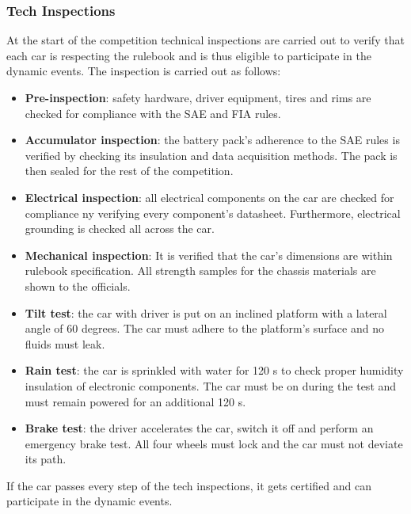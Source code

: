 \subsubsection{Tech Inspections}
At the start of the competition technical inspections are carried out to verify that each car is respecting the rulebook and is thus eligible to participate in the dynamic events.
The inspection is carried out as follows:
\begin{itemize}
    \item \textbf{Pre-inspection}: safety hardware, driver equipment, tires and rims are checked for compliance with the SAE and FIA rules.
    \item \textbf{Accumulator inspection}: the battery pack's adherence to the SAE rules is verified by checking its insulation and data acquisition methods. The pack is then sealed for the rest of the competition.
    \item \textbf{Electrical inspection}: all electrical components on the car are checked for compliance ny verifying every component's datasheet. Furthermore, electrical grounding is checked all across the car.
    \item \textbf{Mechanical inspection}: It is verified that the car's dimensions are within rulebook specification. All strength samples for the chassis materials are shown to the officials.
    \item \textbf{Tilt test}: the car with driver is put on an inclined platform with a lateral angle of 60 degrees. The car must adhere to the platform's surface and no fluids must leak.
    \item \textbf{Rain test}: the car is sprinkled with water for 120 s to check proper humidity insulation of electronic components. The car must be on during the test and must remain powered for an additional 120 s.
    \item \textbf{Brake test}: the driver accelerates the car, switch it off and perform an emergency brake test. All four wheels must lock and the car must not deviate its path.
\end{itemize}
If the car passes every step of the tech inspections, it gets certified and can participate in the dynamic events.


